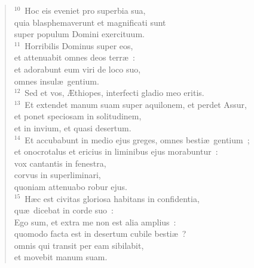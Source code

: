 \begin{flushleft}
\begin{verse}
${}^{10}$~Hoc eis eveniet pro superbia sua,\\ quia blasphemaverunt et magnificati sunt\\ super populum Domini exercituum.\\
${}^{11}$~Horribilis Dominus super eos,\\ et attenuabit omnes deos terr\ae~:\\ et adorabunt eum viri de loco suo,\\ omnes insul\ae\ gentium.\\
${}^{12}$~Sed et vos, \AE thiopes, interfecti gladio meo eritis.\\
${}^{13}$~Et extendet manum suam super aquilonem, et perdet Assur,\\ et ponet speciosam in solitudinem,\\ et in invium, et quasi desertum.\\
${}^{14}$~Et accubabunt in medio ejus greges, omnes besti\ae\ gentium~;\\ et onocrotalus et ericius in liminibus ejus morabuntur~:\\ vox cantantis in fenestra,\\ corvus in superliminari,\\ quoniam attenuabo robur ejus.\\
${}^{15}$~H\ae c est civitas gloriosa habitans in confidentia,\\ qu\ae\ dicebat in corde suo~:\\ Ego sum, et extra me non est alia amplius~:\\ quomodo facta est in desertum cubile besti\ae~?\\ omnis qui transit per eam sibilabit,\\ et movebit manum suam.\end{verse}\end{flushleft}


